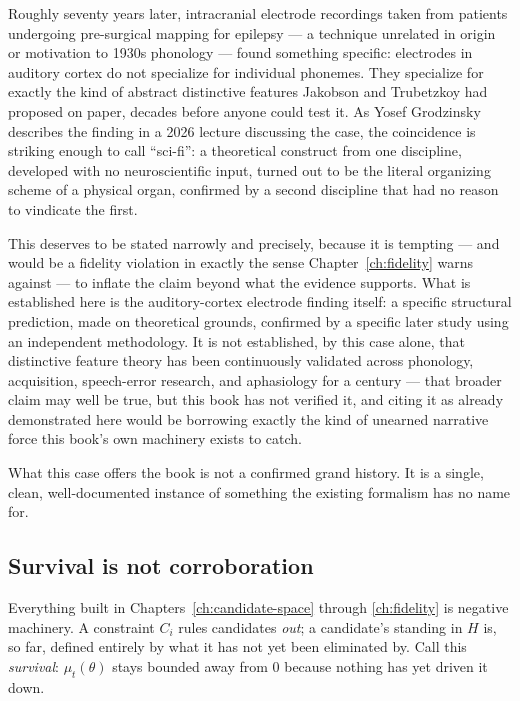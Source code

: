 Roughly seventy years later, intracranial electrode recordings taken from patients undergoing pre-surgical mapping for epilepsy --- a technique unrelated in origin or motivation to 1930s phonology --- found something specific: electrodes in auditory cortex do not specialize for individual phonemes. They specialize for exactly the kind of abstract distinctive features Jakobson and Trubetzkoy had proposed on paper, decades before anyone could test it. As Yosef Grodzinsky describes the finding in a 2026 lecture discussing the case, the coincidence is striking enough to call ``sci-fi'': a theoretical construct from one discipline, developed with no neuroscientific input, turned out to be the literal organizing scheme of a physical organ, confirmed by a second discipline that had no reason to vindicate the first.

This deserves to be stated narrowly and precisely, because it is tempting --- and would be a fidelity violation in exactly the sense Chapter~\ref{ch:fidelity} warns against --- to inflate the claim beyond what the evidence supports. What is established here is the auditory-cortex electrode finding itself: a specific structural prediction, made on theoretical grounds, confirmed by a specific later study using an independent methodology. It is not established, by this case alone, that distinctive feature theory has been continuously validated across phonology, acquisition, speech-error research, and aphasiology for a century --- that broader claim may well be true, but this book has not verified it, and citing it as already demonstrated here would be borrowing exactly the kind of unearned narrative force this book's own machinery exists to catch.

What this case offers the book is not a confirmed grand history. It is a single, clean, well-documented instance of something the existing formalism has no name for.

\subsection{Survival is not corroboration}

Everything built in Chapters~\ref{ch:candidate-space} through \ref{ch:fidelity} is negative machinery. A constraint $C_i$ rules candidates \emph{out}; a candidate's standing in $H$ is, so far, defined entirely by what it has not yet been eliminated by. Call this \emph{survival}: $\mu_t(\theta)$ stays bounded away from $0$ because nothing has yet driven it down.

